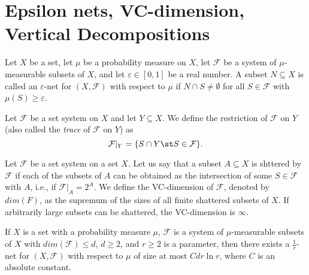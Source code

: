 \section{Epsilon nets, VC-dimension, Vertical Decompositions}
\label{app:vc-dimension}

\begin{definition}
	Let \(X\) be a set, let \(\mu\) be a probability measure on \(X\), let
	\(\mathcal{F}\) be a system of \(\mu\)-measurable subsets of \(X\), and let
	\(\varepsilon \in [0,1]\) be a real number. A subset \(N\subseteq X\) is
	called an \(\varepsilon\)-net for \((X,\mathcal{F})\) with respect to
	\(\mu\) if \(N \cap S \neq \emptyset\) for all \(S \in \mathcal{F}\) with
	\(\mu(S) \ge \varepsilon\).
\end{definition}

\begin{definition}
	Let \(\mathcal{F}\) be a set system on \(X\) and let \(Y \subseteq X\). We define the
	restriction of \(\mathcal{F}\) on \(Y\) (also called the \emph{trace} of
	\(\mathcal{F}\) on
	\(Y\)) as
	\begin{displaymath}
		\mathcal{F}|_Y = \{S \cap Y \st S \in \mathcal{F}\}.
	\end{displaymath}
\end{definition}

\begin{definition}[VC-dimension]
	Let \(\mathcal{F}\) be a set system on a set \(X\). Let us say that a subset \(A
	\subseteq X\) is shttered by \(\mathcal{F}\) if each of the subsets of \(A\) can
	be obtained as the intersection of some \(S \in \mathcal{F}\) with \(A\), i.e.,
	if \(\mathcal{F}|_A = 2^{A}\). We define the VC-dimension of
					\(\mathcal{F}\), denoted
		by \(dim(F)\), as the supremum of the sizes of all finite shattered
		subsets of \(X\). If arbitrarily large subsets can be shattered, the
		VC-dimension is \(\infty\).
\end{definition}

\begin{theorem}
	If \(X\) is a set with a probability measure \(\mu\), \(\mathcal{F}\) is a system of
	\(\mu\)-measurable subsets of \(X\) with \(dim(\mathcal{F}) \le d\), \(d\ge 2\), and
	\(r \ge 2\) is a parameter, then there exists a \(\frac{1}{r}\)-net for
	\((X,\mathcal{F})\) with respect to \(\mu\) of size at most \(Cdr\ln r\), where \(C\)
	is an absolute constant.
\end{theorem}


